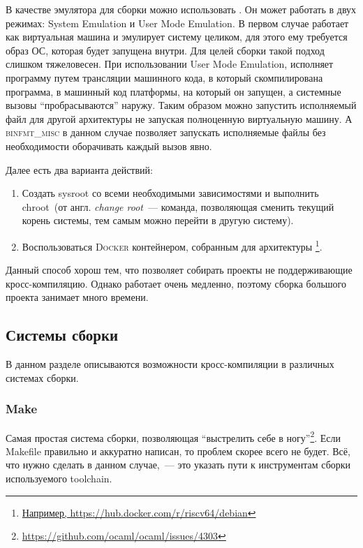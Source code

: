 В качестве эмулятора для сборки можно использовать \qemu{}.
Он может работать в двух режимах: System Emulation и User Mode Emulation.
В первом случае \qemu{} работает как виртуальная машина и эмулирует систему целиком, для этого ему требуется образ ОС, которая будет запущена внутри.
Для целей сборки такой подход слишком тяжеловесен.
При использовании User Mode Emulation, \qemu{} исполняет программу путем трансляции машинного кода, в который скомпилирована программа, в машинный код платформы, на который он запущен, а системные вызовы \enquote{пробрасываются} наружу.
Таким образом можно запустить исполняемый файл для другой архитектуры не запуская полноценную виртуальную машину.
А \textsc{binfmt\_misc} в данном случае позволяет запускать исполняемые файлы без необходимости оборачивать каждый вызов явно.

Далее есть два варианта действий:
\begin{enumerate}
	\item Создать sysroot со всеми необходимыми зависимостями и выполнить chroot~(от англ. \textit{change root}~--- команда, позволяющая сменить текущий корень системы, тем самым можно перейти в другую систему).
	\item Воспользоваться \textsc{Docker} контейнером, собранным для архитектуры \riscv{}\footnote{\url{Например, https://hub.docker.com/r/riscv64/debian}}.
\end{enumerate}

Данный способ хорош тем, что позволяет собирать проекты не поддерживающие кросс-компиляцию.
Однако \qemu{} работает очень медленно, поэтому сборка большого проекта занимает много времени.

\subsection{Системы сборки}
\label{subsec:build_systems}

В данном разделе описываются возможности кросс-компиляции в различных системах сборки.

\subsubsection{Make}

Самая простая система сборки, позволяющая \enquote{выстрелить себе в ногу}\footnote{\url{https://github.com/ocaml/ocaml/issues/4303}}.
Если Makefile правильно и аккуратно написан, то проблем скорее всего не будет.
Всё, что нужно сделать в данном случае,~--- это указать пути к инструментам сборки используемого toolchain.

